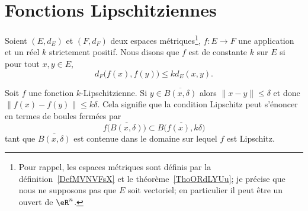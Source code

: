 
\section{Fonctions Lipschitziennes}


\begin{definition}      \label{DEFooQHVEooDbYKmz}
	Soient \( (E,d_E)\) et \( (F,d_F)\) deux espaces métriques\footnote{Pour rappel, les espaces métriques sont définis par la définition~\ref{DefMVNVFsX} et le théorème~\ref{ThoORdLYUu}; je précise que nous ne supposons pas que \( E\) soit vectoriel; en particulier il peut être un ouvert de \( \eR^n\).}, \( f\colon E\to F\) une application et un réel \( k\) strictement positif. Nous disons que \( f\) est  de constante \( k\) sur \( E\) si pour tout \( x,y\in E\),
	\begin{equation}
		d_F\big( f(x),f(y) \big)\leq kd_E(x,y).
	\end{equation}
\end{definition}

Soit \( f\) une fonction \( k\)-Lipschitzienne. Si \( y\in \overline{ B(x,\delta)}\) alors \( \| x-y \|\leq\delta\) et donc \( \big\| f(x)-f(y) \big\|\leq k\delta\). Cela signifie que la condition Lipschitz peut s'énoncer en termes de boules fermées par
\begin{equation}    \label{EqDZvtUbn}
	f\big( \overline{ B(x,\delta) } \big)\subset \overline{  B\big( f(x),k\delta \big) }
\end{equation}
tant que \( \overline{ B(x,\delta) } \) est contenue dans le domaine sur lequel \( f\) est Lipschitz.


